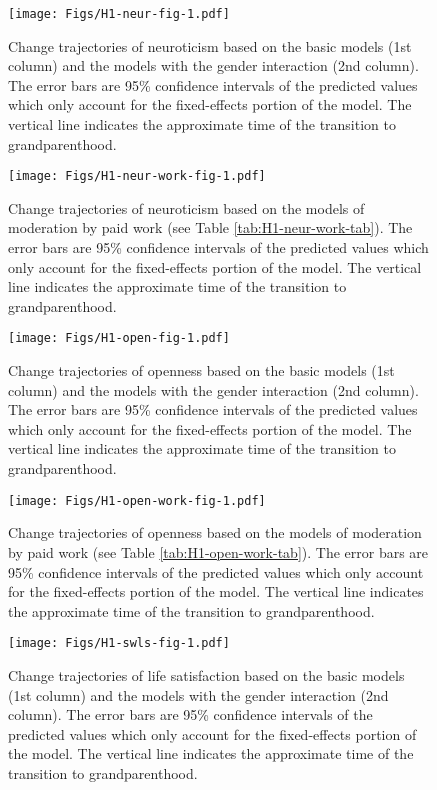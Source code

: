 \documentclass[
  english,
  man, noextraspace]{apa7}
\begin{document}
\begin{figure}
\centering
\texttt{[image: Figs/H1-neur-fig-1.pdf]}
\caption{\label{fig:H1-neur-fig}Change trajectories of neuroticism based on the basic models (1st column) and the models with the gender interaction (2nd column). The error bars are 95\% confidence intervals of the predicted values which only account for the fixed-effects portion of the model. The vertical line indicates the approximate time of the transition to grandparenthood.}
\end{figure}



\begin{figure}
\centering
\texttt{[image: Figs/H1-neur-work-fig-1.pdf]}
\caption{\label{fig:H1-neur-work-fig}Change trajectories of neuroticism based on the models of moderation by paid work (see Table \ref{tab:H1-neur-work-tab}). The error bars are 95\% confidence intervals of the predicted values which only account for the fixed-effects portion of the model. The vertical line indicates the approximate time of the transition to grandparenthood.}
\end{figure}



\begin{figure}
\centering
\texttt{[image: Figs/H1-open-fig-1.pdf]}
\caption{\label{fig:H1-open-fig}Change trajectories of openness based on the basic models (1st column) and the models with the gender interaction (2nd column). The error bars are 95\% confidence intervals of the predicted values which only account for the fixed-effects portion of the model. The vertical line indicates the approximate time of the transition to grandparenthood.}
\end{figure}



\begin{figure}
\centering
\texttt{[image: Figs/H1-open-work-fig-1.pdf]}
\caption{\label{fig:H1-open-work-fig}Change trajectories of openness based on the models of moderation by paid work (see Table \ref{tab:H1-open-work-tab}). The error bars are 95\% confidence intervals of the predicted values which only account for the fixed-effects portion of the model. The vertical line indicates the approximate time of the transition to grandparenthood.}
\end{figure}



\begin{figure}
\centering
\texttt{[image: Figs/H1-swls-fig-1.pdf]}
\caption{\label{fig:H1-swls-fig}Change trajectories of life satisfaction based on the basic models (1st column) and the models with the gender interaction (2nd column). The error bars are 95\% confidence intervals of the predicted values which only account for the fixed-effects portion of the model. The vertical line indicates the approximate time of the transition to grandparenthood.}
\end{figure}
\end{document}
